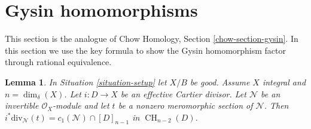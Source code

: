 \documentclass{stacks-project}
\theoremstyle{plain}
\newtheorem{lemma}[subsection]{Lemma}
\theoremstyle{definition}
\theoremstyle{remark}
\numberwithin{equation}{subsection}
\def\CH{\mathop{\mathrm{CH}}\nolimits}
\begin{document}
\section{Gysin homomorphisms}
\label{section-gysin}

\noindent
This section is the analogue of
Chow Homology, Section \ref{chow-section-gysin}.
In this section we use the key formula to show the Gysin homomorphism
factor through rational equivalence.

\begin{lemma}
\label{lemma-gysin-factors-general}
In Situation \ref{situation-setup} let $X/B$ be good.
Assume $X$ integral and $n = \dim_\delta(X)$.
Let $i : D \to X$ be an effective Cartier divisor.
Let $\mathcal{N}$ be an invertible $\mathcal{O}_X$-module
and let $t$ be a nonzero meromorphic section of $\mathcal{N}$.
Then $i^*\text{div}_\mathcal{N}(t) = c_1(\mathcal{N}) \cap [D]_{n - 1}$
in $\CH_{n - 2}(D)$.
\end{lemma}
\end{document}
